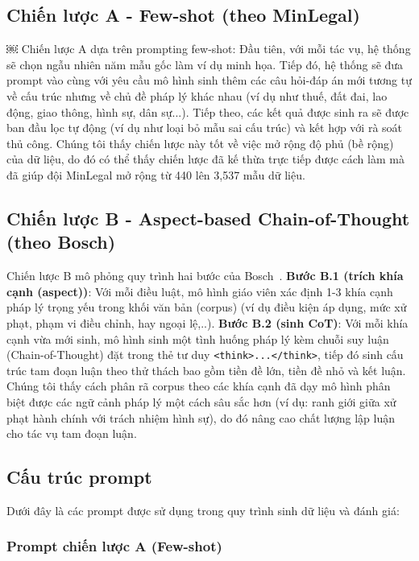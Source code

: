 \subsection{Chiến lược A - Few-shot (theo MinLegal)}
￼
Chiến lược A dựa trên prompting few-shot: Đầu tiên, với mỗi tác vụ, hệ thống sẽ chọn ngẫu nhiên năm mẫu gốc làm ví dụ minh họa. Tiếp đó, hệ thống sẽ đưa prompt vào cùng với yêu cầu mô hình sinh thêm các câu hỏi-đáp án mới tương tự về cấu trúc nhưng về chủ đề pháp lý khác nhau (ví dụ như thuế, đất đai, lao động, giao thông, hình sự, dân sự...). Tiếp theo, các kết quả được sinh ra sẽ được ban đầu lọc tự động (ví dụ như loại bỏ mẫu sai cấu trúc) và kết hợp với rà soát thủ công. Chúng tôi thấy chiến lược này tốt về việc mở rộng độ phủ (bề rộng) của dữ liệu, do đó có thể thấy chiến lược đã kế thừa trực tiếp được cách làm mà đã giúp đội MinLegal mở rộng từ 440 lên 3,537 mẫu dữ liệu.

\subsection{Chiến lược B - Aspect-based Chain-of-Thought (theo Bosch)}

Chiến lược B mô phỏng quy trình hai bước của Bosch~\cite{quang2025bosch}. \textbf{Bước B.1 (trích khía cạnh (aspect))}: Với mỗi điều luật, mô hình giáo viên xác định 1-3 khía cạnh pháp lý trọng yếu trong khối văn bản (corpus) (ví dụ điều kiện áp dụng, mức xử phạt, phạm vi điều chỉnh, hay ngoại lệ,..). \textbf{Bước B.2 (sinh CoT)}: Với mỗi khía cạnh vừa mới sinh, mô hình sinh một tình huống pháp lý kèm chuỗi suy luận (Chain-of-Thought) đặt trong thẻ tư duy \texttt{<think>...</think>}, tiếp đó sinh cấu trúc tam đoạn luận theo thử thách bao gồm tiền đề lớn, tiền đề nhỏ và kết luận. Chúng tôi thấy cách phân rã corpus theo các khía cạnh đã dạy mô hình phân biệt được các ngữ cảnh pháp lý một cách sâu sắc hơn (ví dụ: ranh giới giữa xử phạt hành chính với trách nhiệm hình sự), do đó nâng cao chất lượng lập luận cho tác vụ tam đoạn luận.

\subsection{Cấu trúc prompt}

Dưới đây là các prompt được sử dụng trong quy trình sinh dữ liệu và đánh giá:

\subsubsection{Prompt chiến lược A (Few-shot)}

